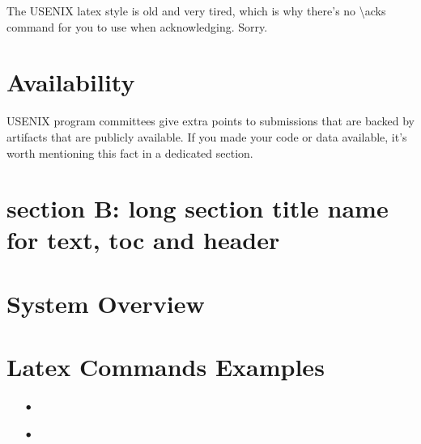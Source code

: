 The USENIX latex style is old and very tired, which is why there's no \textbackslash{}acks command for you to use when acknowledging. Sorry.\par

\section*{Availability}

USENIX program committees give extra points to submissions that are backed by artifacts that are publicly available. If you made your code or data available, it's worth mentioning this fact in a dedicated section.\par

\section[section B: manage long sec name]{section B: long section title name for text, toc and header}
\lipsum[8-12]

\section{System Overview}
\lipsum[9-13]

\section{Latex Commands Examples}

\begin{itemize}
    \item[$\bullet$] \lipsum[1]
    \item[$\bullet$] \lipsum[2]
\end{itemize}
%
